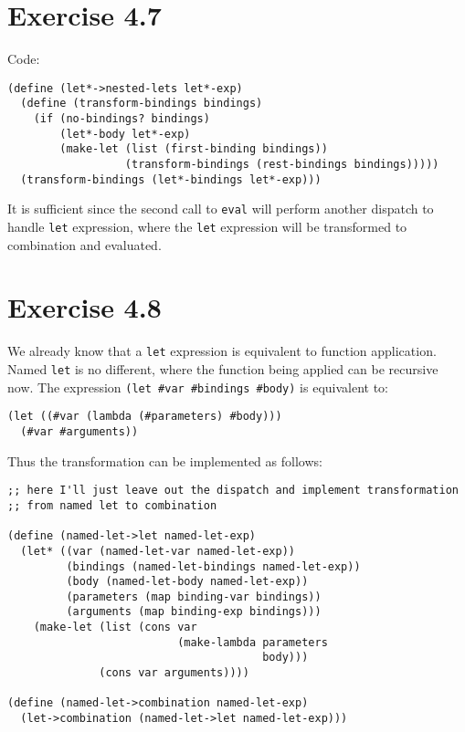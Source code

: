 \documentclass[../main.tex]{subfiles}
\begin{document}
\section{Exercise 4.7}

Code:

\begin{lstlisting}
(define (let*->nested-lets let*-exp)
  (define (transform-bindings bindings)
    (if (no-bindings? bindings)
        (let*-body let*-exp)
        (make-let (list (first-binding bindings))
                  (transform-bindings (rest-bindings bindings)))))
  (transform-bindings (let*-bindings let*-exp)))
\end{lstlisting}

It is sufficient since the second call to \lstinline{eval} will
perform another dispatch to handle \lstinline{let} expression, where
the \lstinline{let} expression will be transformed to combination
and evaluated.

\section{Exercise 4.8}

We already know that a \lstinline{let} expression is equivalent
to function application. Named \lstinline{let} is no different, where
the function being applied can be recursive now. The expression
\lstinline{(let #var #bindings #body)} is equivalent to:

\begin{lstlisting}
(let ((#var (lambda (#parameters) #body)))
  (#var #arguments))
\end{lstlisting}

Thus the transformation can be implemented as follows:

\begin{lstlisting}
;; here I'll just leave out the dispatch and implement transformation
;; from named let to combination

(define (named-let->let named-let-exp)
  (let* ((var (named-let-var named-let-exp))
         (bindings (named-let-bindings named-let-exp))
         (body (named-let-body named-let-exp))
         (parameters (map binding-var bindings))
         (arguments (map binding-exp bindings)))
    (make-let (list (cons var
                          (make-lambda parameters
                                       body)))
              (cons var arguments))))

(define (named-let->combination named-let-exp)
  (let->combination (named-let->let named-let-exp)))
\end{lstlisting}
\end{document}

